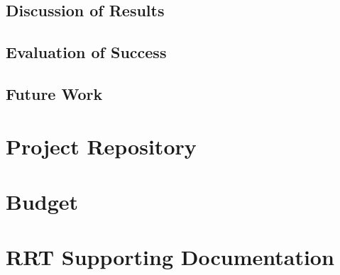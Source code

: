 \documentclass[
    11pt,           %
    letterpaper,    %
    oneside         %
]{report}           %
\begin{document}
    \section{Discussion of Results}
    \section{Evaluation of Success}
    \section{Future Work}




\printglossary[type=main]

\begin{appendices}

\chapter{Project Repository}
    \label{appendix:repository}
    

\chapter{Budget}

\chapter{RRT Supporting Documentation}
    \label{appendix:rrt_appendix}
    


\end{appendices} 
\clearpage 
\listoftodos 
\end{document}
